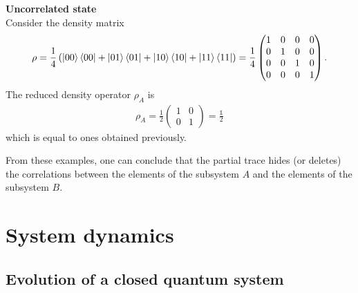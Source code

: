\begin{tcolorbox} 
\textbf{Uncorrelated state} \\ 
Consider the density matrix
\begin{align*}
    \rho = \frac{1}{4} \left( \ket{00} \bra{00} + \ket{01} \bra{01} + \ket{10} \bra{10} +\ket{11} \bra{11} \right) = \frac{1}{4} \begin{pmatrix} 1 & 0 & 0 & 0 \\ 0 & 1 & 0 & 0 \\ 0 & 0 & 1 & 0 \\ 0 & 0 & 0 & 1 \end{pmatrix}.
\end{align*}
The reduced density operator $\rho_A$ is 
\begin{align*}
    \rho_A = \frac{1}{2} \begin{pmatrix} 1 & 0 \\ 0 & 1 \end{pmatrix} = \frac{\mathbb{1}}{2}
\end{align*}
which is equal to ones obtained previously. 
\end{tcolorbox}

From these examples, one can conclude that the partial trace hides (or deletes) the correlations between the elements of the subsystem $A$ and the elements of the subsystem $B$. \\


\section{System dynamics}
\label{sec:ME}

\subsection{Evolution of a closed quantum system}

